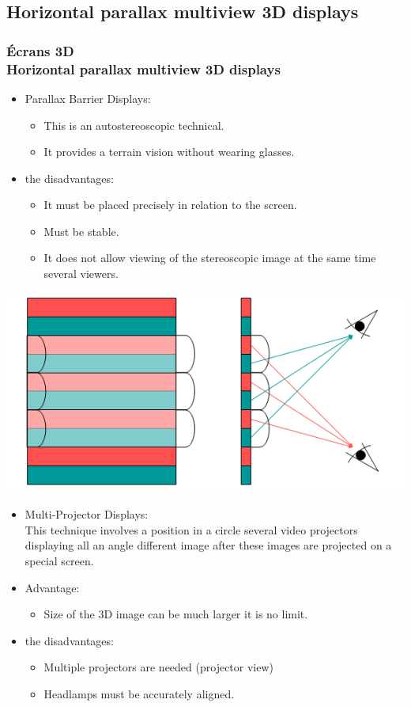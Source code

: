 \subsection{Horizontal parallax multiview 3D displays}	

\begin{frame}

  \frametitle{Écrans 3D \\Horizontal parallax multiview 3D displays} 
  
  \begin{itemize}
  \item Parallax Barrier Displays:
    
    \begin{itemize}
    \item This is an autostereoscopic technical.
    \item It provides a terrain vision without wearing glasses.
    \end{itemize}
  \item the disadvantages:
    \begin{itemize} 	
    \item	It must be placed precisely in relation to the screen.
    \item Must be stable.
    \item It does not allow viewing of the stereoscopic image at the same time several viewers.
    \end{itemize}
  \end{itemize}
  \includegraphics[keepaspectratio,height=.13\linewidth]{4.png}
\end{frame}

\begin{frame}
  \begin{itemize}
  \item Multi-Projector Displays:\\
 This technique involves a position in a circle several video projectors displaying all an angle different image after these images are projected on a special screen.			
  \item Advantage:
    \begin{itemize} 
    \item Size of the 3D image can be much larger it is no limit.
    \end{itemize}
  \item the disadvantages:
    \begin{itemize} 	
    \item	Multiple projectors are needed (projector view)
    \item Headlamps must be accurately aligned.
    \end{itemize}
  \end{itemize}
\end{frame}

